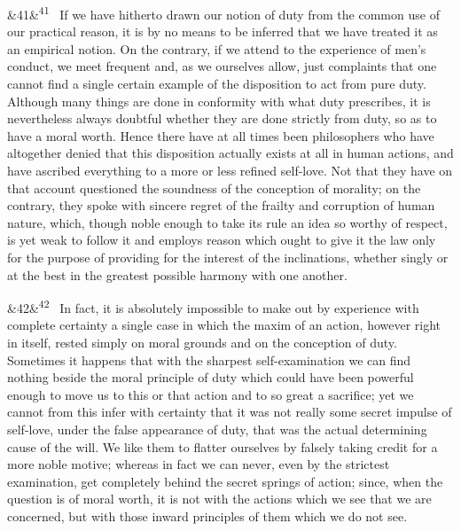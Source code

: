\documentclass[12pt]{article}
\newcommand{\para}[1][]{\par\noindent\ifx&#1&\else\textsuperscript{\footnotesize #1}~\fi}
\begin{document}
\para[41] If we have hitherto drawn our notion of duty from the common use of our practical reason, it is by no means to be inferred that we have treated it as an empirical notion. On the contrary, if we attend to the experience of men's conduct, we meet frequent and, as we ourselves allow, just complaints that one cannot find a single certain example of the disposition to act from pure duty. Although many things are done in conformity with what duty prescribes, it is nevertheless always doubtful whether they are done strictly from duty, so as to have a moral worth. Hence there have at all times been philosophers who have altogether denied that this disposition actually exists at all in human actions, and have ascribed everything to a more or less refined self-love. Not that they have on that account questioned the soundness of the conception of morality; on the contrary, they spoke with sincere regret of the frailty and corruption of human nature, which, though noble enough to take its rule an idea so worthy of respect, is yet weak to follow it and employs reason which ought to give it the law only for the purpose of providing for the interest of the inclinations, whether singly or at the best in the greatest possible harmony with one another.

\para[42] In fact, it is absolutely impossible to make out by experience with complete certainty a single case in which the maxim of an action, however right in itself, rested simply on moral grounds and on the conception of duty. Sometimes it happens that with the sharpest self-examination we can find nothing beside the moral principle of duty which could have been powerful enough to move us to this or that action and to so great a sacrifice; yet we cannot from this infer with certainty that it was not really some secret impulse of self-love, under the false appearance of duty, that was the actual determining cause of the will. We like them to flatter ourselves by falsely taking credit for a more noble motive; whereas in fact we can never, even by the strictest examination, get completely behind the secret springs of action; since, when the question is of moral worth, it is not with the actions which we see that we are concerned, but with those inward principles of them which we do not see.
\end{document}
